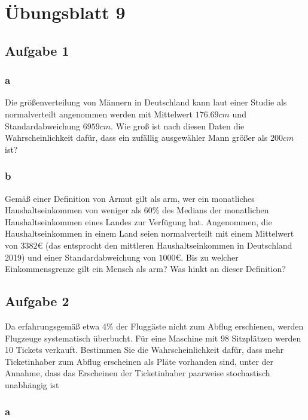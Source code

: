 \chapter{Übungsblatt 9}

\section{Aufgabe 1}

\subsection{a}

Die größenverteilung von Männern in Deutschland kann laut einer Studie als normalverteilt angenommen werden mit Mittelwert $176.69cm$ und Standardabweichung $6959 cm$. Wie groß ist nach diesen Daten die Wahrscheinlichkeit dafür, dass ein zufällig ausgewähler Mann größer als $200 cm$ ist?

\subsection{b}

Gemäß einer Definition von Armut gilt als arm, wer ein monatliches Haushaltseinkommen von weniger als 60\% des Medians der monatlichen Haushaltseinkommen eines Landes zur Verfügung hat. Angenommen, die Haushaltseinkommen in einem Land seien normalverteilt mit einem Mittelwert von $3382 €$ (das entsprocht den mittleren Haushaltseinkommen in Deutschland 2019) und einer Standardabweichung von $1000 €$. Bis zu welcher Einkommensgrenze gilt ein Mensch als arm? Was hinkt an dieser Definition?

\section{Aufgabe 2}

Da erfahrungsgemäß etwa 4\% der Fluggäste nicht zum Abflug erschienen, werden Flugzeuge systematisch überbucht. Für eine Maschine mit 98 Sitzplätzen werden 10 Tickets verkauft. Bestimmen Sie die Wahrscheinlichkeit dafür, dass mehr Ticketinhaber zum Abflug erscheinen als Pläte vorhanden sind, unter der Annahme, dass das Erscheinen der Ticketinhaber paarweise stochastisch unabhängig ist

\subsection{a}

